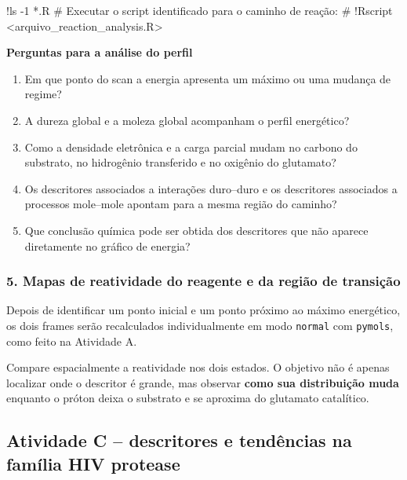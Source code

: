 \documentclass[a4paper,11pt]{refart}
\newcommand{\code}[1]{\texttt{#1}}
\begin{document}
\begin{shell}
!ls -1 *.R
# Executar o script identificado para o caminho de reação:
# !Rscript <arquivo_reaction_analysis.R>
\end{shell}

\begin{interpretacaobox}
\textbf{Perguntas para a análise do perfil}
\begin{enumerate}
    \item Em que ponto do scan a energia apresenta um máximo ou uma mudança de regime?
    \item A dureza global e a moleza global acompanham o perfil energético?
    \item Como a densidade eletrônica e a carga parcial mudam no carbono do substrato, no hidrogênio transferido e no oxigênio do glutamato?
    \item Os descritores associados a interações duro--duro e os descritores associados a processos mole--mole apontam para a mesma região do caminho?
    \item Que conclusão química pode ser obtida dos descritores que não aparece diretamente no gráfico de energia?
\end{enumerate}
\end{interpretacaobox}

\subsubsection{5. Mapas de reatividade do reagente e da região de transição}

Depois de identificar um ponto inicial e um ponto próximo ao máximo energético, os dois frames serão recalculados individualmente em modo \code{normal} com \code{pymols}, como feito na Atividade A.

\begin{interpretacaobox}
Compare espacialmente a reatividade nos dois estados. O objetivo não é apenas localizar onde o descritor é grande, mas observar \textbf{como sua distribuição muda} enquanto o próton deixa o substrato e se aproxima do glutamato catalítico.
\end{interpretacaobox}

\subsection{Atividade C -- descritores e tendências na família HIV protease}
\end{document}
